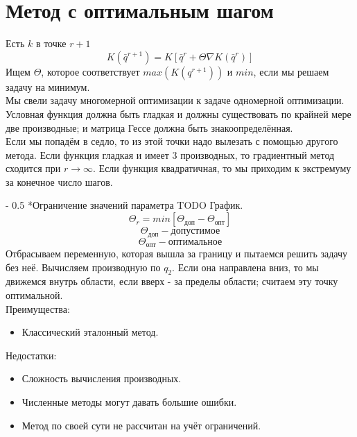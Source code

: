 \documentclass[12pt,a5paper]{scrbook}
\makeatletter
\renewcommand\paragraph{\@startsection{paragraph}{4}{0mm}%
{-\baselineskip} %
{0.5\baselineskip} %
{\normalfont\bfseries}}%
\makeatother
\begin{document}
  \section{Метод с оптимальным шагом}
  Есть $k$ в точке $r+1$
  $$K(\bar{q}^{r+1}) = K[\bar{q}^r + \Theta\nabla K(\bar{q}^r)]$$
  Ищем $\Theta$, которое соответствует $max(K(q^{r+1}))$ и $min$, если мы решаем задачу на минимум.\\
  Мы свели задачу многомерной оптимизации к задаче одномерной оптимизации. Условная функция должна быть гладкая и должны существовать по крайней мере две производные; и матрица Гессе должна быть знакоопределённая.\\
  Если мы попадём в седло, то из этой точки надо вылезать с помощью другого метода. Если функция гладкая и имеет 3 производных, то градиентный метод сходится при $r \rightarrow \infty$. Если функция квадратичная, то мы приходим к экстремуму за конечное число шагов.
  
  \paragraph*{Ограничение значений параметра}
  TODO График.
  $$\Theta_r = min[\Theta_{\text{доп}} - \Theta_{\text{опт}}]$$
  $$\Theta_{\text{доп}} - \text{допустимое}$$
  $$\Theta_{\text{опт}} - \text{оптимальное}$$
  Отбрасываем переменную, которая вышла за границу и пытаемся решить задачу без неё. Вычисляем производную по $q_2$. Если она направлена вниз, то мы движемся внутрь области, если вверх - за пределы области; считаем эту точку оптимальной.\\
  Преимущества: 
  \begin{itemize}
    \item Классический эталонный метод.
  \end{itemize}
  Недостатки: 
  \begin{itemize}
    \item Сложность вычисления производных.
    \item Численные методы могут давать большие ошибки.
    \item Метод по своей сути не рассчитан на учёт ограничений.
  \end{itemize}
\end{document}
